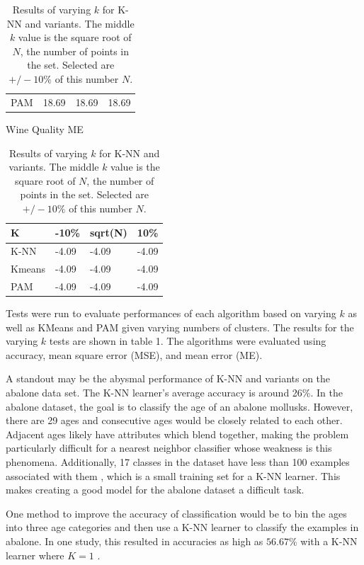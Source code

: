 \documentclass[twoside,11pt]{article}
\begin{document}
\begin{table}[h]
\begin{minipage}[b]{0.45\linewidth}
\begin{tabular}{llll}
			PAM    & 18.69 & 18.69   & 18.69
		\end{tabular}
	\end{minipage}
	\hspace{0.5cm}\centering
	\centering
	\begin{minipage}[b]{0.45\linewidth}
		Wine Quality ME
		\centering
		\begin{tabular}{llll}
			\hline
			K      & -10\% & sqrt(N) & 10\%  \\ \hline
			K-NN   & -4.09 & -4.09   & -4.09 \\
			Kmeans & -4.09 & -4.09   & -4.09 \\
			PAM    & -4.09 & -4.09   & -4.09
		\end{tabular}
	\end{minipage}
	\caption{Results of varying $k$ for K-NN and variants. The middle $k$ value is the square root of $N$, the number of points in the set. Selected are $+/- 10\%$ of this number $N$.}
\end{table}

Tests were run to evaluate performances of each algorithm based on varying $k$ as well as KMeans and PAM given varying numbers of clusters. The results for the varying $k$ tests are shown in table 1. The algorithms were evaluated using accuracy, mean square error (MSE), and mean error (ME).

A standout may be the abysmal performance of K-NN and variants on the abalone data set. The K-NN learner's average accuracy is around 26\%. In the abalone dataset, the goal is to classify the age of an abalone mollusks. However, there are 29 ages and consecutive ages would be closely related to each other. Adjacent ages likely have attributes which blend together, making the problem particularly difficult for a nearest neighbor classifier whose weakness is this phenomena.
Additionally, 17 classes in the dataset have less than 100 examples associated with them \citep{datasets}, which is a small training set for a K-NN learner.
This makes creating a good model for the abalone dataset a difficult task.

One method to improve the accuracy of classification would be to bin the ages into three age categories and then use a K-NN learner to classify the examples in abalone. In one study, this resulted in accuracies as high as $56.67\%$ with a K-NN learner where $K = 1$ \citep{abalone-bad}.
\end{document}
